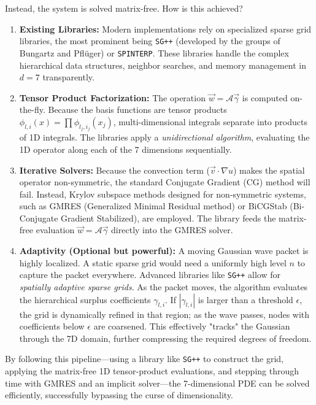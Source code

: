 \documentclass[12pt, a4paper]{article}
\begin{document}
Instead, the system is solved matrix-free. How is this achieved?
\begin{enumerate}
    \item \textbf{Existing Libraries:} Modern implementations rely on specialized sparse grid libraries, the most prominent being \texttt{SG++} (developed by the groups of Bungartz and Pflüger) or \texttt{SPINTERP}. These libraries handle the complex hierarchical data structures, neighbor searches, and memory management in $d=7$ transparently.
    \item \textbf{Tensor Product Factorization:} The operation $\vec{w} = \mathcal{A} \vec{\gamma}$ is computed on-the-fly. Because the basis functions are tensor products $\phi_{l,i}(x) = \prod \phi_{l_j, i_j}(x_j)$, multi-dimensional integrals separate into products of 1D integrals. The libraries apply a \textit{unidirectional algorithm}, evaluating the 1D operator along each of the 7 dimensions sequentially. 
    \item \textbf{Iterative Solvers:} Because the convection term ($\vec{v} \cdot \nabla u$) makes the spatial operator non-symmetric, the standard Conjugate Gradient (CG) method will fail. Instead, Krylov subspace methods designed for non-symmetric systems, such as GMRES (Generalized Minimal Residual method) or BiCGStab (Bi-Conjugate Gradient Stabilized), are employed. The library feeds the matrix-free evaluation $\vec{w} = \mathcal{A} \vec{\gamma}$ directly into the GMRES solver.
    \item \textbf{Adaptivity (Optional but powerful):} A moving Gaussian wave packet is highly localized. A static sparse grid would need a uniformly high level $n$ to capture the packet everywhere. Advanced libraries like \texttt{SG++} allow for \textit{spatially adaptive sparse grids}. As the packet moves, the algorithm evaluates the hierarchical surplus coefficients $\gamma_{l,i}$. If $|\gamma_{l,i}|$ is larger than a threshold $\epsilon$, the grid is dynamically refined in that region; as the wave passes, nodes with coefficients below $\epsilon$ are coarsened. This effectively "tracks" the Gaussian through the 7D domain, further compressing the required degrees of freedom.
\end{enumerate}

By following this pipeline—using a library like \texttt{SG++} to construct the grid, applying the matrix-free 1D tensor-product evaluations, and stepping through time with GMRES and an implicit solver—the 7-dimensional PDE can be solved efficiently, successfully bypassing the curse of dimensionality.
\end{document}
